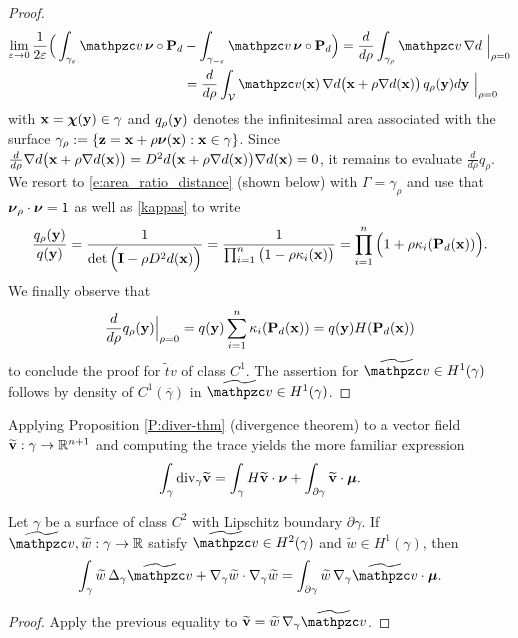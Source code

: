 \begin{proof}
%
\begin{align*}
\mathop{\lim}_{\varepsilon\to0} \frac{1}{2\varepsilon}
\Big( \int_{\gamma_\varepsilon} \tv \, \bnu\circ\bP_d
& - \int_{\gamma_{-\varepsilon}} \tv \, \bnu\circ\bP_d  \Big)
= \frac{d}{d\rho} \int_{\gamma_\rho} \tv \, \nabla d ~\Big|_{\rho=0}
\\
& = \frac{d}{d\rho} \int_{\mathcal{V}} \tv(\bx) \, \nabla d\big(\bx+\rho\nabla d(\bx)\big)
\, q_\rho(\by) d\by ~\Big|_{\rho=0}
\end{align*}
%
with ${\bf x} = {\boldsymbol \chi}({\bf y})\in\gamma$ and $q_\rho({\bf y})$ denotes the infinitesimal area associated with the surface $\gamma_\rho:=\{ {\bf z} = {\bf x} + \rho {\boldsymbol \nu}({\bf x}):  {\bf x} \in \gamma\}$. Since
$\frac{d}{d\rho}\nabla d\big({\bf x}+\rho\nabla d({\bf x})\big)
= D^2 d\big({\bf x}+\rho\nabla d({\bf x})\big) \nabla d({\bf x}) = 0$, it remains to evaluate
$\frac{d}{d\rho} q_\rho$. We resort to \eqref{e:area_ratio_distance} (shown below)
with $\Gamma=\gamma_\rho$ and use that ${\boldsymbol \nu}_\rho\cdot{\boldsymbol \nu}=1$
as well as \eqref{kappas} to write
%
\[
\frac{q_\rho({\bf y})}{q({\bf y})} = \frac{1}{\det\Big( {\bf I} - \rho D^2 d({\bf x}) \Big)}
= \frac{1}{\mathop{\prod}_{i=1}^n \big(1-\rho\kappa_i({\bf x}) \big)}
= \mathop{\prod}_{i=1}^n \Big(1+\rho\kappa_i({\bf P}_d({\bf x})) \Big).
\]
%
We finally observe that
%
\[
\frac{d}{d\rho} q_\rho({\bf y}) \Big|_{\rho=0}
= q({\bf y}) \sum_{i=1}^n \kappa_i({\bf P}_d({\bf x})) = q({\bf y}) H({\bf P}_d({\bf x}))
\]
%
to conclude the proof for $\widetilde tv$ of class $C^1$. The assertion for $\ttv\in H^1(\gamma)$
follows by density of $C^1(\overline{\gamma})$ in $\ttv\in H^1(\gamma)$.
\end{proof}

Applying Proposition \ref{P:diver-thm} (divergence theorem) to a vector field $\widetilde{{\bf v}}:\gamma\to\mathbb{R}^{n+1}$
and computing the trace yields the more familiar expression
%
\begin{equation*}
\int_\gamma \textrm{div}_\gamma \widetilde {{\bf v}} = \int_\gamma H \widetilde {{\bf v}}\cdot{\boldsymbol \nu} + \int_{\partial\gamma} \widetilde{{\bf v}}\cdot{\boldsymbol \mu}.
\end{equation*}
%
\begin{corollary}\label{C:int-parts}
Let $\gamma$ be a surface of class $C^2$ with Lipschitz boundary $\partial\gamma$.
If $\ttv, \widetilde w:\gamma\to\mathbb{R}$ satisfy $\ttv\in H^2(\gamma)$ and $\widetilde w\in H^1(\gamma)$,
then
%
\[
\int_\gamma \widetilde w \, \Delta_\gamma \ttv + \nabla_\gamma \widetilde w \cdot \nabla_\gamma \widetilde w
= \int_{\partial\gamma} \widetilde w \, \nabla_\gamma \ttv\cdot\bmu.
\]
\end{corollary}
%
\begin{proof}
Apply the previous equality to $\widetilde \bv = \widetilde w \, \nabla_\gamma \ttv$.
\end{proof}  
  
